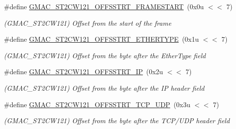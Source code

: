 \begin{DoxyCompactItemize}
\item 
\mbox{\label{group__SAME70__GMAC_ga3fed2be31d3b8177272a62b3866fe01d}} 
\#define \mbox{\hyperlink{group__SAME70__GMAC_ga3fed2be31d3b8177272a62b3866fe01d}{G\+M\+A\+C\+\_\+\+S\+T2\+C\+W121\+\_\+\+O\+F\+F\+S\+S\+T\+R\+T\+\_\+\+F\+R\+A\+M\+E\+S\+T\+A\+RT}}~(0x0u $<$$<$ 7)
\begin{DoxyCompactList}\small\item\em (G\+M\+A\+C\+\_\+\+S\+T2\+C\+W121) Offset from the start of the frame \end{DoxyCompactList}\item 
\mbox{\label{group__SAME70__GMAC_gab8640063dffeafd4390143fc1d407ee8}} 
\#define \mbox{\hyperlink{group__SAME70__GMAC_gab8640063dffeafd4390143fc1d407ee8}{G\+M\+A\+C\+\_\+\+S\+T2\+C\+W121\+\_\+\+O\+F\+F\+S\+S\+T\+R\+T\+\_\+\+E\+T\+H\+E\+R\+T\+Y\+PE}}~(0x1u $<$$<$ 7)
\begin{DoxyCompactList}\small\item\em (G\+M\+A\+C\+\_\+\+S\+T2\+C\+W121) Offset from the byte after the Ether\+Type field \end{DoxyCompactList}\item 
\mbox{\label{group__SAME70__GMAC_ga2afe42fee1a93a74df66f9b1b6f67ff9}} 
\#define \mbox{\hyperlink{group__SAME70__GMAC_ga2afe42fee1a93a74df66f9b1b6f67ff9}{G\+M\+A\+C\+\_\+\+S\+T2\+C\+W121\+\_\+\+O\+F\+F\+S\+S\+T\+R\+T\+\_\+\+IP}}~(0x2u $<$$<$ 7)
\begin{DoxyCompactList}\small\item\em (G\+M\+A\+C\+\_\+\+S\+T2\+C\+W121) Offset from the byte after the IP header field \end{DoxyCompactList}\item 
\mbox{\label{group__SAME70__GMAC_ga4f76808f397c82d81603a31e45e9e880}} 
\#define \mbox{\hyperlink{group__SAME70__GMAC_ga4f76808f397c82d81603a31e45e9e880}{G\+M\+A\+C\+\_\+\+S\+T2\+C\+W121\+\_\+\+O\+F\+F\+S\+S\+T\+R\+T\+\_\+\+T\+C\+P\+\_\+\+U\+DP}}~(0x3u $<$$<$ 7)
\begin{DoxyCompactList}\small\item\em (G\+M\+A\+C\+\_\+\+S\+T2\+C\+W121) Offset from the byte after the T\+C\+P/\+U\+DP header field \end{DoxyCompactList}\item 
\mbox{\label{group__SAME70__GMAC_ga31ce93b8cfa2abf39eae74c7fa29c1dd}} 

\end{DoxyCompactItemize}
